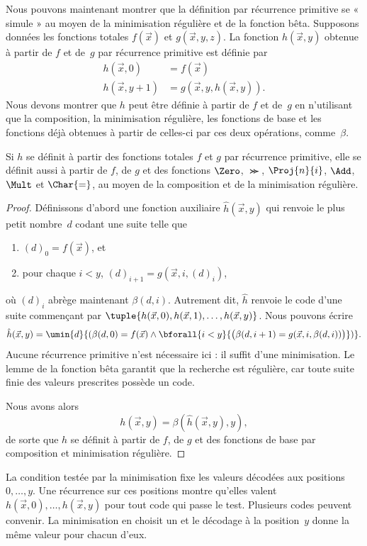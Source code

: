 \documentclass[../../../include/open-logic-section]{subfiles}
\begin{document}

Nous pouvons maintenant montrer que la définition par récurrence
primitive se « simule » au moyen de la minimisation régulière et
de la fonction bêta. Supposons données les fonctions totales
$f(\vec x)$ et $g(\vec x,y,z)$. La fonction $h(\vec x,y)$ obtenue à partir de
$f$ et de~$g$ par récurrence primitive est définie par
\begin{align*}
h(\vec x, 0) & =  f(\vec x) \\
h(\vec x, y+1) & =  g(\vec x, y, h(\vec x, y)).
\end{align*}
Nous devons montrer que $h$ peut être définie à partir de $f$ et
de~$g$ en n'utilisant que la composition, la minimisation
régulière, les fonctions de base et les fonctions déjà obtenues
à partir de celles-ci par ces deux opérations, comme~$\beta$.

\begin{lem}
Si $h$ se définit à partir des fonctions totales $f$ et $g$ par
récurrence primitive, elle se définit aussi à partir de $f$, de $g$ et des
fonctions $\Zero$, $\Succ$, $\Proj{n}{i}$, $\Add$, $\Mult$ et
$\Char{=}$, au moyen de la composition et de la minimisation
régulière.
\end{lem}

\begin{proof}
Définissons d'abord une fonction auxiliaire $\hat h(\vec x,y)$
qui renvoie le plus petit nombre~$d$ codant une suite telle que
\begin{enumerate}
\item $(d)_0=f(\vec x)$, et
\item pour chaque $i<y$, $(d)_{i+1}=g(\vec x,i,(d)_i)$,
\end{enumerate}
où $(d)_i$ abrège maintenant $\beta(d,i)$. Autrement dit,
$\hat h$ renvoie le code d'une suite commençant par
$\tuple{h(\vec x,0),h(\vec x,1),\dots,h(\vec x,y)}$.
Nous pouvons écrire
\[
\hat h(\vec x, y) = \umin{d}{(\beta(d,0) = f(\vec x) \land \bforall{i <
  y}{\bigl(\beta(d,i+1) = g(\vec x,i,\beta(d,i))\bigr)})}.
\]
Aucune récurrence primitive n'est nécessaire ici : il suffit
d'une minimisation. Le lemme de la fonction bêta
 garantit que la recherche est régulière,
car toute suite finie des valeurs prescrites possède un code.

Nous avons alors
\[
h(\vec x, y) = \beta(\hat h(\vec x, y), y),
\]
de sorte que $h$ se définit à partir de $f$, de $g$ et des
fonctions de base par composition et minimisation régulière.
\end{proof}

\begin{explain}
La condition testée par la minimisation fixe les valeurs
décodées aux positions $0,\dots,y$. Une récurrence sur ces
positions montre qu'elles valent $h(\vec x,0),\dots,h(\vec x,y)$
pour tout code qui passe le test. Plusieurs codes peuvent
convenir. La minimisation en choisit un et le décodage à la
position~$y$ donne la même valeur pour chacun d'eux.
\end{explain}
\end{document}
